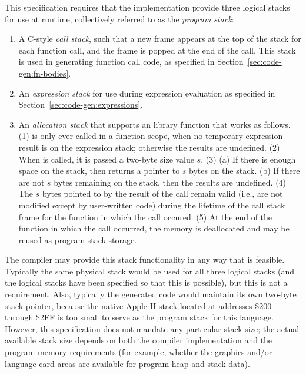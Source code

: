 \documentclass[10pt]{article}
\begin{document}
This specification requires that the implementation provide three
logical stacks for use at runtime, collectively referred to as the
\emph{program stack}:
%
\begin{enumerate}
%
\item A C-style \emph{call stack}, such that a new frame appears at
  the top of the stack for each function call, and the frame is popped
  at the end of the call.  This stack is used in generating function
  call code, as specified in Section~\ref{sec:code-gen:fn-bodies}.
%
\item An \emph{expression stack} for use during expression evaluation
  as specified in Section~\ref{sec:code-gen:expressions}.
%
\item An \emph{allocation stack} that supports an 
  library function that works as follows.  (1)  is only
  ever called in a function scope, when no temporary expression result
  is on the expression stack; otherwise the results are undefined.
  (2) When  is called, it is passed a two-byte size
  value $s$.  (3) (a) If there is enough space on the stack, then
   returns a pointer to $s$ bytes on the stack. (b) If
  there are not $s$ bytes remaining on the stack, then the results are
  undefined. (4) The $s$ bytes pointed to by the result of the
   call remain valid (i.e., are not modified except by
  user-written code) during the lifetime of the call stack frame for
  the function in which the  call occured.  (5) At the
  end of the function in which the  call occurred, the
  memory is deallocated and may be reused as program stack storage.
%
\end{enumerate}

The compiler may provide this stack functionality in any way that is
feasible.  Typically the same physical stack would be used for all
three logical stacks (and the logical stacks have been specified so
that this is possible), but this is not a requirement.  Also,
typically the generated code would maintain its own two-byte stack
pointer, because the native Apple II stack located at addresses \$200
through \$2FF is too small to serve as the program stack for this
language.  However, this specification does not mandate any particular
stack size; the actual available stack size depends on both the
compiler implementation and the program memory requirements (for
example, whether the graphics and/or language card areas are available
for program heap and stack data).
\end{document}
